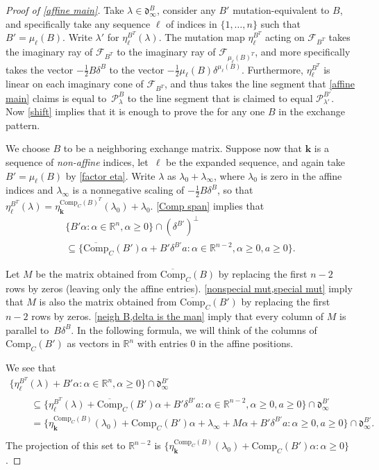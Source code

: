 \documentclass{amsart}
\theoremstyle{definition}
\theoremstyle{remark}
\numberwithin{equation}{section}
\newcommand{\reals}{\mathbb R}
\newcommand{\set}[1]{{\lbrace #1 \rbrace}}
\newcommand{\F}{{\mathcal F}}
\newcommand{\0}{{\mathbf{0}}}
\newcommand{\Comp}{\mathrm{Comp}_C}
\newcommand{\CompPlus}{\overline{\mathrm{Comp}}_C}
\newcommand{\kk}{\mathbf{k}}
\renewcommand{\ll}{{\boldsymbol\ell}}
\renewcommand{\P}{\mathcal{P}}
\renewcommand{\d}{{\mathfrak d}}
\begin{document}
\begin{proof}[Proof of \cref{affine main}]
Take $\lambda\in\d_\infty^B$, consider any $B'$ mutation-equivalent to $B$, and specifically take any sequence $\ll$ of indices in $\set{1,\ldots,n}$ such that $B'=\mu_\ll(B)$.
Write $\lambda'$ for $\eta_\ll^{B^T}(\lambda)$.
The mutation map $\eta_\ll^{B^T}$ acting on $\F_{B^T}$ takes the imaginary ray of $\F_{B^T}$ to the imaginary ray of $\F_{\mu_\ll(B)^T}$, and more specifically takes the vector $-\frac12B\delta^B$ to the vector $-\frac12\mu_\ll(B)\delta^{\mu_\ll(B)}$.
Furthermore, $\eta_\ll^{B^T}$ is linear on each imaginary cone of $\F_{B^T}$, and thus takes the line segment that \cref{affine main} claims is equal to~$\P_\lambda^B$ to the line segment that is claimed to equal $\P_{\lambda'}^{B'}$.
Now \cref{shift} implies that it is enough to prove the  for any one $B$ in the exchange pattern.

We choose $B$ to be a neighboring exchange matrix.
Suppose now that $\kk$ is a sequence of \emph{non-affine} indices, let~$\ll$ be the expanded sequence, and again take $B'=\mu_\ll(B)$ by \cref{factor eta}.
Write $\lambda$ as $\lambda_0+\lambda_\infty$, where $\lambda_0$ is zero in the affine indices and $\lambda_\infty$ is a nonnegative scaling of $-\frac12B\delta^B$, so that ${\eta^{B^T}_\ll(\lambda)=\eta_\kk^{\Comp(B)^T}(\lambda_0)+\lambda_0}$.
\cref{Comp span} implies that 
\begin{multline*}
\set{B'\alpha:\alpha\in\reals^n,\alpha\ge0}\cap(\delta^{B'})^\perp\\
\subseteq\set{\CompPlus(B')\alpha+B'\delta^{B'}a:\alpha\in\reals^{n-2},\alpha\ge0,a\ge0}.
\end{multline*}

Let $M$ be the matrix obtained from $\CompPlus(B)$ by replacing the first $n-2$ rows by zeros (leaving only the affine entries).
\cref{nonspecial mut,special mut} imply that $M$ is also the matrix obtained from $\CompPlus(B')$ by replacing the first $n-2$ rows by zeros.
\cref{neigh B,delta is the man} imply that every column of $M$ is parallel to~$B\delta^B$.
In the following formula, we will think of the columns of $\Comp(B')$ as vectors in $\reals^n$ with entries $0$ in the affine positions.

We see that 
\begin{multline*}
\set{\eta_\ll^{B^T}(\lambda)+B'\alpha:\alpha\in\reals^n,\alpha\ge0}\cap\d^{B'}_\infty\\
\begin{aligned}
&\quad\subseteq\set{\eta_\ll^{B^T}(\lambda)+\CompPlus(B')\alpha+B'\delta^{B'}a:\alpha\in\reals^{n-2},\alpha\ge0,a\ge0}\cap\d^{B'}_\infty\\
&\quad=\set{\eta_\kk^{\Comp(B)}(\lambda_0)+\Comp(B')\alpha+\lambda_\infty+M\alpha+B'\delta^{B'}a:\alpha\ge0,a\ge0}\cap\d^{B'}_\infty.\\
\end{aligned}
\end{multline*}
The projection of this set to $\reals^{n-2}$ is $\set{\eta_\kk^{\Comp(B)}(\lambda_0)+\Comp(B')\alpha:\alpha\ge0}$.


\end{proof}
\end{document}
